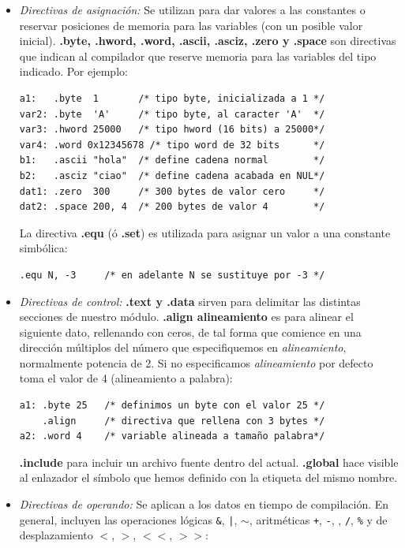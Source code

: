 \begin{itemize}
        \item \textit{Directivas de asignación:} Se utilizan para dar
valores a las constantes o reservar posiciones de memoria para las
variables (con un posible valor inicial).  \textbf{.byte, .hword, .word,
.ascii, .asciz, .zero y .space}
son directivas que indican al compilador que reserve memoria para
las variables del tipo indicado. Por ejemplo:

\begin{lstlisting}
a1:   .byte  1       /* tipo byte, inicializada a 1 */
var2: .byte  'A'     /* tipo byte, al caracter 'A'  */
var3: .hword 25000   /* tipo hword (16 bits) a 25000*/
var4: .word 0x12345678 /* tipo word de 32 bits      */
b1:   .ascii "hola"  /* define cadena normal        */
b2:   .asciz "ciao"  /* define cadena acabada en NUL*/
dat1: .zero  300     /* 300 bytes de valor cero     */
dat2: .space 200, 4  /* 200 bytes de valor 4        */
\end{lstlisting}

La directiva \textbf{.equ} (ó \textbf{.set}) es utilizada para asignar un
valor a una constante simbólica:

\begin{lstlisting}
.equ N, -3     /* en adelante N se sustituye por -3 */
\end{lstlisting}

\item \textit{Directivas de control:}
        \textbf{.text y .data} sirven para delimitar las distintas secciones
        de nuestro módulo.
        \textbf{.align {alineamiento}} es para alinear el siguiente dato,
        rellenando con ceros, de tal forma que comience en una dirección
        múltiplos del número que especifiquemos en {\it alineamiento},
        normalmente potencia de 2. Si no especificamos {\it alineamiento}
        por defecto toma el valor de 4 (alineamiento a palabra):

\begin{lstlisting}
a1: .byte 25   /* definimos un byte con el valor 25 */
    .align     /* directiva que rellena con 3 bytes */
a2: .word 4    /* variable alineada a tamaño palabra*/
\end{lstlisting}

        \textbf{.include} para incluir un archivo fuente dentro del actual.
        \textbf{.global} hace visible al enlazador el símbolo que hemos
        definido con la etiqueta del mismo nombre.

     \item \textit{Directivas de operando:} Se aplican a los datos en
        tiempo de compilación. En general, incluyen las operaciones lógicas
        {\tt \&}, {\tt |}, {\tt $\sim$}, aritméticas {\tt +}, {\tt -},
        {\tt *}, {\tt /}, {\tt \%} y de desplazamiento
        {\tt $<$}, {\tt $>$}, {\tt $<<$}, {\tt $>>$}:


\end{itemize}
